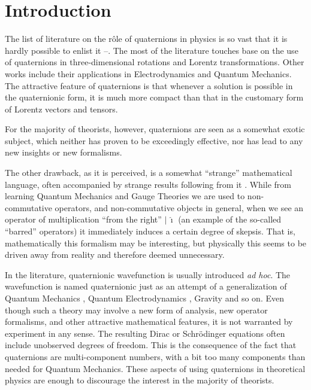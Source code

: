 \documentclass[epsfig,12pt]{article}
\newcommand{\ii}{\hat\imath}
\begin{document}
\section{Introduction}
\setcounter{equation}{0}

	The list of literature on the r\^ole of quaternions in physics is so vast that it is hardly
	possible to enlist it \cite{Adler:1988hb}--\cite{Chanyal:2012rj}.
	The most of the literature touches base on the use of quaternions in three-dimensional
	rotations and Lorentz transformations.
	Other works include their applications in Electrodynamics and Quantum Mechanics.
	The attractive feature of quaternions is that whenever a solution is possible in the quaternionic form,
	it is much more compact than that in the customary form of Lorentz vectors and tensors. 

	For the majority of theorists, however, quaternions are seen as a somewhat exotic subject,
	which neither has proven to be exceedingly effective, nor has lead
	to any new insights or new formalisms.

	The other drawback, as it is perceived, is a somewhat ``strange'' mathematical language,
        often accompanied by strange results following from it \cite{DeLeo:1998yi}.
	While from learning Quantum Mechanics and Gauge Theories we are used to non-commutative operators,
	and non-commutative objects in general, when we see an operator of multiplication ``from the right'' $ |\, \ii $
        (an example of the so-called ``barred'' operators) it immediately induces a certain degree of skepsis.
	That is, mathematically this formalism may be interesting, but physically this seems to be
	driven away from reality and therefore deemed unnecessary.

	In the literature, quaternionic wavefunction is usually introduced \emph{ad hoc}.
	The wavefunction is named quaternionic just as an attempt of a generalization of Quantum Mechanics \cite{Adler:1988hb}, \cite{Edmonds:1972vd}
	Quantum Electrodynamics \cite{DeLeo:2000ik}, Gravity \cite{Rawat:2011ch} and so on.
	Even though such a theory may involve a new form of analysis, new operator formalisms,
	and other attractive mathematical features, it is not warranted by experiment in any sense. 
	The resulting Dirac or Schr\"odinger equations often include unobserved degrees of freedom.
	This is the consequence of the fact that quaternions are multi-component numbers,
        with a bit too many components than needed for Quantum Mechanics.
        These aspects of using quaternions in theoretical physics are enough to discourage the interest in the
        majority of theorists.
\end{document}
